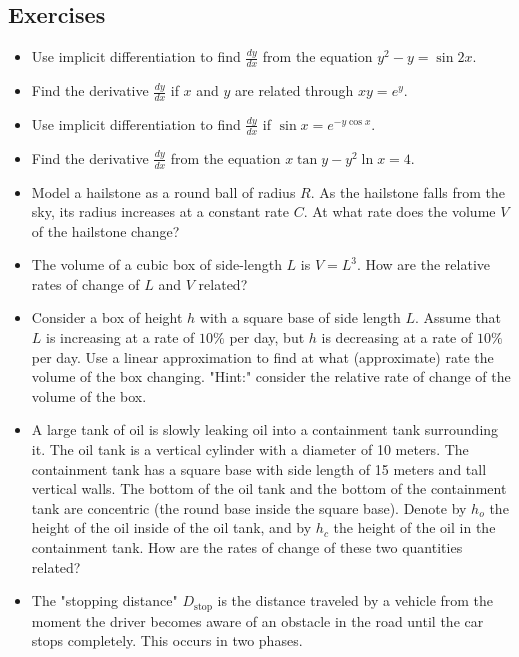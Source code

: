 \documentclass[twoside,openright,titlepage,a4paper]{book}
\begin{document}
\begin{sloppypar}
\subsection{Exercises}
\begin{itemize}
\item Use implicit differentiation to find $\displaystyle \frac{dy}{dx}$ from the equation $y^2 - y = \sin 2x$.
\item Find the derivative $\displaystyle \frac{dy}{dx}$ if $x$ and $y$ are related through $xy = e^y$.
\item Use implicit differentiation to find $\displaystyle \frac{dy}{dx}$ if $\sin x = e^{-y\cos x}$.
\item Find the derivative $\displaystyle \frac{dy}{dx}$ from the equation $x\tan y - y^2\ln x = 4$.
\item Model a hailstone as a round ball of radius $R$. As the hailstone falls from the sky, its radius increases at a constant rate $C$. At what rate does the volume $V$ of the hailstone change?
\item The volume of a cubic box of side-length $L$ is $V = L^3$. How are the relative rates of change of $L$ and $V$ related?
\item Consider a box of height $h$ with a square base of side length $L$. Assume that $L$ is increasing at a rate of $10\% $ per day, but $h$ is decreasing at a rate of $10\%$ per day. Use a linear approximation to find at what (approximate) rate the volume of the box changing. "Hint:" consider the relative rate of change of the volume of the box.
\item A large tank of oil is slowly leaking oil into a containment tank surrounding it. The oil tank is a vertical cylinder with a diameter of 10 meters. The containment tank has a square base with side length of 15 meters and tall vertical walls. The bottom of the oil tank and the bottom of the containment tank are concentric (the round base inside the square base). Denote by $h_o$ the height of the oil inside of the oil tank, and by $h_c$ the height of the oil in the containment tank. How are the rates of change of these two quantities related?
\item The "stopping distance" $D_\mathrm{stop}$ is the distance traveled by a vehicle from the moment the driver becomes aware of an obstacle in the road until the car stops completely. This occurs in two phases.\\

\end{itemize}
\end{sloppypar}
\end{document}
